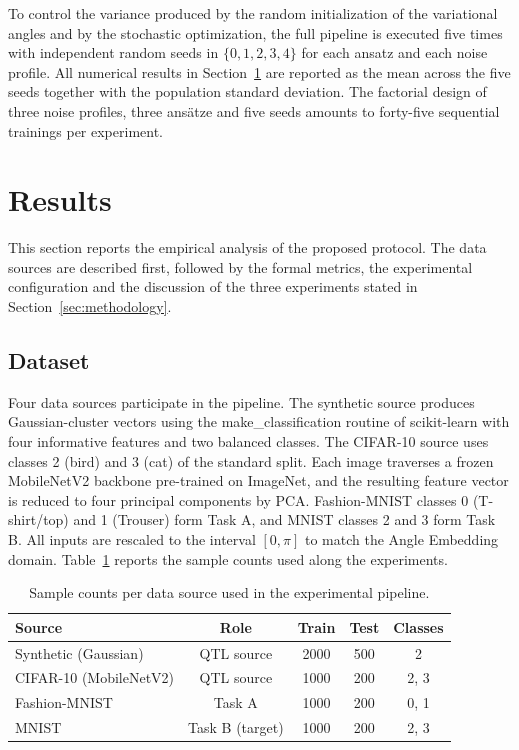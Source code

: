 \documentclass[conference]{IEEEtran}
\begin{document}
To control the variance produced by the random initialization of the variational angles and by the stochastic optimization, the full pipeline is executed five times with independent random seeds in $\{0,1,2,3,4\}$ for each ansatz and each noise profile. All numerical results in Section~\ref{sec:results} are reported as the mean across the five seeds together with the population standard deviation. The factorial design of three noise profiles, three ans\"atze and five seeds amounts to forty-five sequential trainings per experiment.

\section{Results}\label{sec:results}

This section reports the empirical analysis of the proposed protocol. The data sources are described first, followed by the formal metrics, the experimental configuration and the discussion of the three experiments stated in Section~\ref{sec:methodology}.

\subsection{Dataset}

Four data sources participate in the pipeline. The synthetic source produces Gaussian-cluster vectors using the make\_classification routine of scikit-learn with four informative features and two balanced classes. The CIFAR-10 source uses classes 2 (bird) and 3 (cat) of the standard split. Each image traverses a frozen MobileNetV2 backbone pre-trained on ImageNet, and the resulting feature vector is reduced to four principal components by PCA. Fashion-MNIST classes 0 (T-shirt/top) and 1 (Trouser) form Task A, and MNIST classes 2 and 3 form Task B. All inputs are rescaled to the interval $[0,\pi]$ to match the Angle Embedding domain. Table~\ref{tab:datasets} reports the sample counts used along the experiments.

\begin{table}[ht]
\centering
\caption{Sample counts per data source used in the experimental pipeline.}
\label{tab:datasets}
\begin{tabular}{lcccc}
\toprule
Source & Role & Train & Test & Classes \\
\midrule
Synthetic (Gaussian)    & QTL source       & 2000 & 500 & 2 \\
CIFAR-10 (MobileNetV2)  & QTL source       & 1000 & 200 & 2, 3 \\
Fashion-MNIST           & Task A           & 1000 & 200 & 0, 1 \\
MNIST                   & Task B (target)  & 1000 & 200 & 2, 3 \\
\bottomrule
\end{tabular}
\end{table}
\end{document}
